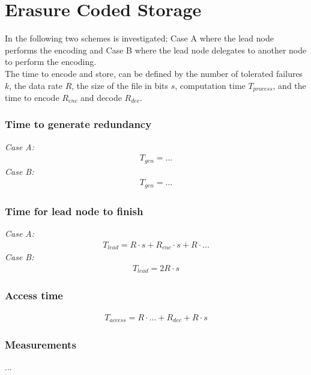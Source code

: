 \section{Erasure Coded Storage}
In the following two schemes is investigated; Case A where the lead node performs the encoding and Case B where the lead node delegates to another node to perform the encoding.\\
The time to encode and store, can be defined by the number of tolerated failures $k$, the data rate $R$, the size of the file in bits $s$, computation time $T_{process}$, and the time to encode $R_{enc}$ and decode $R_{dec}$.

\subsubsection*{Time to generate redundancy}
\textit{Case A:} 
\begin{align}
    T_{gen} = ...
\end{align}
\textit{Case B:} 
\begin{align}
    T_{gen} = ...
\end{align}

\subsubsection*{Time for lead node to finish}
\textit{Case A:} 
\begin{align}
    T_{lead} = R \cdot s + R_{enc} \cdot s + R \cdot ...
\end{align}
\textit{Case B:} 
\begin{align}
    T_{lead} = 2R \cdot s
\end{align}

\subsubsection*{Access time}
\begin{align}
    T_{access} = R \cdot ... + R_{dec} + R \cdot s
\end{align}

\subsubsection*{Measurements}
...